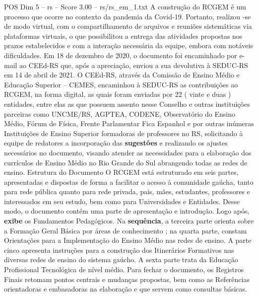 \begin{textsample}{POS Dim 5 – rs – Score 3.00 – rs/rs\_em\_1.txt}
A construção do RCGEM é um processo que ocorre no contexto da pandemia da Covid-19.
Portanto, realizou -se de modo virtual, com o compartilhamento de arquivos e reuniões sistemáticas via plataformas virtuais, o que possibilitou a entrega das atividades propostas nos prazos estabelecidos e com a interação necessária da equipe, embora com notáveis dificuldades.
Em 18 de dezembro de 2020, o documento foi encaminhado por e-mail ao CEEd-RS que, após a apreciação, enviou a sua devolutiva à SEDUC-RS em 14 de abril de 2021.
O CEEd-RS, através da Comissão de Ensino Médio e Educação Superior – CEMES, encaminhou à SEDUC-RS as contribuições ao RCGEM, na forma digital, as quais foram enviadas por 22 ( vinte e duas ) entidades, entre elas as que possuem assento nesse Conselho e outras instituições parceiras como UNCME/RS, AGPTEA, CODENE, Observatório do Ensino Médio, Fórum de Física, Frente Parlamentar Fica Espanhol e por outras inúmeras Instituições de Ensino Superior formadoras de professores no RS, solicitando à equipe de redatores a incorporação das \textbf{sugestões} e realizando os ajustes necessários no documento, visando atender as necessidades para a elaboração dos currículos de Ensino Médio no Rio Grande do Sul abrangendo todas as redes de ensino.
Estrutura do Documento O RCGEM está estruturado em seis partes, apresentadas e dispostas de forma a facilitar o acesso à comunidade gaúcha, tanto para rede pública quanto para rede privada, pais, mães, estudantes, professores e interessados em seu estudo, bem como para Universidades e Entidades.
Desse modo, o documento contém uma parte de apresentação e introdução.
Logo após, \textbf{exibe} os Fundamentos Pedagógicos.
Na \textbf{sequência}, a terceira parte orienta sobre a Formação Geral Básica por áreas de conhecimento ; na quarta parte, constam Orientações para a Implementação do Ensino Médio nas redes de ensino.
A parte cinco apresenta instruções para a construção dos Itinerários Formativos nas diversas redes de ensino do sistema gaúcho.
A sexta parte trata da Educação Profissional Tecnológica de nível médio.
Para fechar o documento, os Registros Finais retomam pontos centrais e mudanças propostas, bem como as Referências orientadoras e embasadoras na elaboração e que servem como consultas básicas.

\end{textsample}
